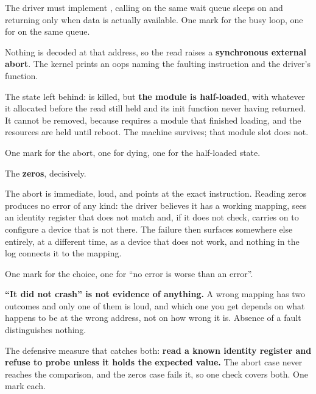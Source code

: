 The driver must implement , calling  on the same wait queue 
sleeps on and returning  only when data is actually available. One mark
for the busy loop, one for  on the same queue.


Nothing is decoded at that address, so the read raises a \textbf{synchronous external abort}. The
kernel prints an oops naming the faulting instruction and the driver's function.

The state left behind:  is killed, but \textbf{the module is half-loaded}, with
whatever it allocated before the read still held and its init function never having returned. It
cannot be removed, because  requires a module that finished loading, and the resources
are held until reboot. The machine survives; that module slot does not.

One mark for the abort, one for  dying, one for the half-loaded state.

The \textbf{zeros}, decisively.

The abort is immediate, loud, and points at the exact instruction. Reading zeros produces no error
of any kind: the driver believes it has a working mapping, sees an identity register that does not
match and, if it does not check, carries on to configure a device that is not there. The failure
then surfaces somewhere else entirely, at a different time, as a device that does not work, and
nothing in the log connects it to the mapping.

One mark for the choice, one for ``no error is worse than an error''.

\textbf{``It did not crash'' is not evidence of anything.} A wrong mapping has two outcomes and only
one of them is loud, and which one you get depends on what happens to be at the wrong address, not
on how wrong it is. Absence of a fault distinguishes nothing.

The defensive measure that catches both: \textbf{read a known identity register and refuse to probe
unless it holds the expected value.} The abort case never reaches the comparison, and the zeros case
fails it, so one check covers both. One mark each.

